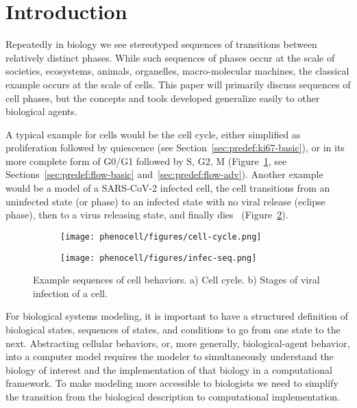 
\section{Introduction}\label{sec:intro}

Repeatedly in biology we see stereotyped sequences of transitions between relatively distinct phases. While such sequences of phases occur at the scale of societies, ecosystems, animals, organelles, macro-molecular machines, the classical example occurs at the scale of cells. This paper will primarily discuss sequences of cell phases, but the concepts and tools developed generalize easily to other biological agents.


A typical example for cells would be the cell cycle, either simplified as proliferation followed by quiescence (see Section~\ref{sec:predef:ki67-basic}), or in its more complete form of G0/G1 followed by S, G2, M (Figure~\ref{fig:example-seq:cell-cycle}, see Sections~\ref{sec:predef:flow-basic} and~\ref{sec:predef:flow-adv}). Another example would be a model of a SARS-CoV-2 infected cell, the cell transitions from an uninfected state (or phase) to an infected state with no viral release (eclipse phase), then to a virus releasing state, and finally  dies~\cite{sego_modular_2020} (Figure~\ref{fig:example-seq:infec-seq}). 

\begin{figure}[!htbp]
    \centering
    \begin{subfigure}{0.45\textwidth}
        \texttt{[image: phenocell/figures/cell-cycle.png]}
        \caption{}\label{fig:example-seq:cell-cycle}
    \end{subfigure}
    \begin{subfigure}{0.45\textwidth}
        \texttt{[image: phenocell/figures/infec-seq.png]}
        \caption{}\label{fig:example-seq:infec-seq}
    \end{subfigure}
    \caption{Example sequences of cell behaviors. a) Cell cycle. b) Stages of viral infection of a cell.}\label{fig:example-seq}
\end{figure}

For biological systems modeling, it is important to have a structured definition of biological states, sequences of states, and conditions to go from one state to the next. Abstracting cellular behaviors, or, more generally, biological-agent behavior, into a computer model requires the modeler to simultaneously understand the biology of interest and the implementation of that biology in a computational framework. To make modeling more accessible to biologists we need to simplify the transition from the biological description to computational implementation. 

